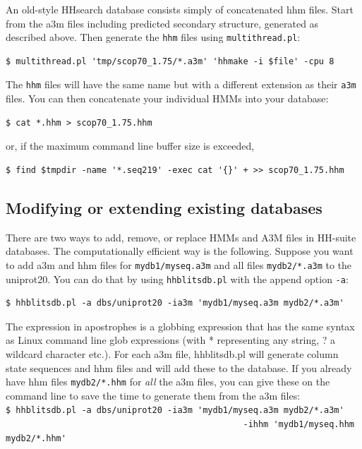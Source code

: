 \documentclass[11pt,a4paper]{article}
\begin{document}
An old-style HHsearch database consists simply of concatenated hhm files. Start from the a3m files including predicted secondary structure, generated as described above. Then generate the \verb`hhm` files using \verb`multithread.pl`:
\begin{verbatim}
$ multithread.pl 'tmp/scop70_1.75/*.a3m' 'hhmake -i $file' -cpu 8 
\end{verbatim}
The \verb`hhm` files will have the same name but with a different extension as their \verb`a3m` files. You 
can then concatenate your individual HMMs into your database:
\begin{verbatim}
$ cat *.hhm > scop70_1.75.hhm
\end{verbatim}
or, if the maximum command line buffer size is exceeded, 
\begin{verbatim}
$ find $tmpdir -name '*.seq219' -exec cat '{}' + >> scop70_1.75.hhm
\end{verbatim}


\subsection{Modifying or extending existing databases}

There are two ways to add, remove, or replace HMMs and A3M files in HH-suite databases. The computationally efficient way is the following. Suppose you want to add a3m and hhm files for \verb`mydb1/myseq.a3m` and all files \verb`mydb2/*.a3m` to the uniprot20. You can do that by using \verb`hhblitsdb.pl` with the append option \verb`-a`:   
\begin{verbatim}
$ hhblitsdb.pl -a dbs/uniprot20 -ia3m 'mydb1/myseq.a3m mydb2/*.a3m' 
\end{verbatim}
The expression in apostrophes is a globbing expression that has the same syntax as Linux command line glob expressions (with * representing any string, ? a wildcard character etc.). For each a3m file, hhblitsdb.pl will generate column state sequences and hhm files and will add these to the database. If you already have hhm files \verb`mydb2/*.hhm` for \emph{all} the a3m files, you can give these on the command line to save the time to generate them from the a3m files: 
\\[-1mm]

\verb`$ hhblitsdb.pl -a dbs/uniprot20 -ia3m 'mydb1/myseq.a3m mydb2/*.a3m'`\\
\verb`                                               -ihhm 'mydb1/myseq.hhm mydb2/*.hhm'`\\[-1mm]
\end{document}
